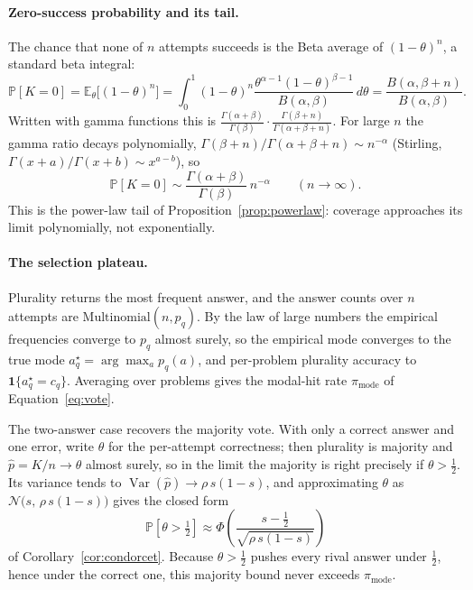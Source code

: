 \documentclass[11pt]{article}
\newcommand{\E}{\mathbb{E}}
\newcommand{\Prob}{\mathbb{P}}
\newcommand{\Var}{\operatorname{Var}}
\begin{document}
\paragraph{Zero-success probability and its tail.}
The chance that none of $n$ attempts succeeds is the Beta average of $(1-\theta)^n$, a standard beta integral:
\[
\Prob[K=0] = \E_\theta\big[(1-\theta)^n\big]
= \int_0^1 (1-\theta)^n \frac{\theta^{\alpha-1}(1-\theta)^{\beta-1}}{B(\alpha,\beta)}\,d\theta
= \frac{B(\alpha,\beta+n)}{B(\alpha,\beta)}.
\]
Written with gamma functions this is $\frac{\Gamma(\alpha+\beta)}{\Gamma(\beta)}\cdot\frac{\Gamma(\beta+n)}{\Gamma(\alpha+\beta+n)}$. For large $n$ the gamma ratio decays polynomially, $\Gamma(\beta+n)/\Gamma(\alpha+\beta+n)\sim n^{-\alpha}$ (Stirling, $\Gamma(x+a)/\Gamma(x+b)\sim x^{a-b}$), so
\[
\Prob[K=0] \sim \frac{\Gamma(\alpha+\beta)}{\Gamma(\beta)}\, n^{-\alpha} \qquad (n\to\infty).
\]
This is the power-law tail of Proposition~\ref{prop:powerlaw}: coverage approaches its limit polynomially, not exponentially.

\paragraph{The selection plateau.}
Plurality returns the most frequent answer, and the answer counts over $n$ attempts are $\mathrm{Multinomial}(n,p_q)$. By the law of large numbers the empirical frequencies converge to $p_q$ almost surely, so the empirical mode converges to the true mode $a^\star_q=\arg\max_a p_q(a)$, and per-problem plurality accuracy to $\mathbf 1\{a^\star_q=c_q\}$. Averaging over problems gives the modal-hit rate $\pi_{\mathrm{mode}}$ of Equation~\eqref{eq:vote}.

The two-answer case recovers the majority vote. With only a correct answer and one error, write $\theta$ for the per-attempt correctness; then plurality is majority and $\hat p=K/n\to\theta$ almost surely, so in the limit the majority is right precisely if $\theta>\tfrac12$. Its variance tends to $\Var(\hat p)\to\rho\,s(1-s)$, and approximating $\theta$ as $\mathcal N\big(s,\,\rho\,s(1-s)\big)$ gives the closed form
\[
\Prob[\theta>\tfrac12] \approx \Phi\!\left(\frac{s-\tfrac12}{\sqrt{\rho\,s(1-s)}}\right)
\]
of Corollary~\ref{cor:condorcet}. Because $\theta>\tfrac12$ pushes every rival answer under $\tfrac12$, hence under the correct one, this majority bound never exceeds $\pi_{\mathrm{mode}}$.
\end{document}
